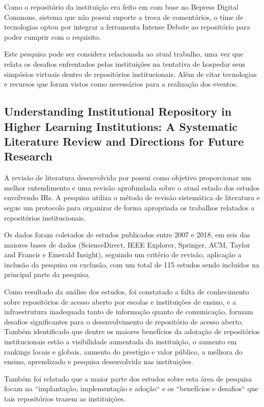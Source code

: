 Como o repositório da instituição era feito em com base no Bepress Digital
Commons, sistema que não possui suporte a troca de comentários, o time de
tecnologias optou por integrar a ferramenta Intense Debate ao repositório
para poder cumprir com o requisito.

Este pesquisa pode ser considera relacionada ao atual trabalho, uma vez
que relata os desafios enfrentados pelas instituições na tentativa de
hospedar seus simpósios virtuais dentro de repositórios institucionais.
Além de citar tecnologias e recursos que foram vistos como necessários
para a realização dos eventos.

\subsection{Understanding Institutional Repository in Higher Learning Institutions: A Systematic Literature Review and Directions for Future Research}

A revisão de literatura desenvolvida por \cite{2019:Asadi} possui como objetivo
proporcionar um melhor entendimento e uma revisão aprofundada sobre o atual estado
dos estudos envolvendo IRs. A pesquisa utiliza o método de revisão sistemática
de literatura e segue um protocolo para organizar de forma apropriada os
trabalhos relatados a repositórios institucionais.

Os dados foram coletados de estudos publicados entre 2007 e 2018, em
seis das maiores bases de dados (ScienceDirect, IEEE Explorer, Springer, ACM,
Taylor and Francis e Emerald Insight), seguindo um critério de revisão, aplicação
a inclusão da pesquisa ou exclusão, com um total de 115 estudos sendo
incluídos na principal parte da pesquisa.

Como resultado da análise dos estudos, foi constatado a falta de conhecimento
sobre repositórios de acesso aberto por escolas e instituições de ensino, e
a infraestrutura inadequada tanto de informação quanto de comunicação, formam
desafios significantes para o desenvolvimento de repositório de acesso aberto.
Também identificado que dentre os maiores benefícios da adotação de repositórios
institucionais estão a visibilidade aumentada da instituição, o aumento em
rankings locais e globais, aumento do prestígio e valor público, a melhora do
ensino, aprendizado e pesquisa desenvolvida nas instituições.

Também foi relatado que a maior parte dos estudos sobre esta área de pesquisa
focam na ``implantação, implementação e adoção`` e os ``benefícios e desafios``
que tais repositórios trazem as instituições.

